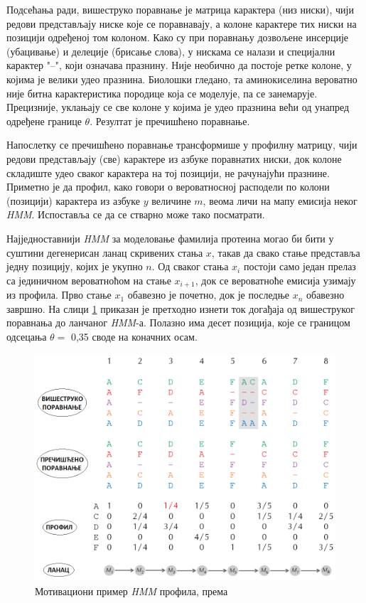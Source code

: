 \documentclass[12pt,oneside]{memoir}
\begin{document}
\begin{CJK}{UTF8}{ipxm}
Подсећања ради, вишеструко поравнање је матрица карактера (низ ниски), чији редови представљају ниске које се поравнавају, а колоне карактере тих ниски на позицији одређеној том колоном. Како су при поравнању дозвољене инсерције (убацивање) и делеције (брисање слова), у нискама се налази и специјални карактер "--", који означава празнину. Није необично да постоје ретке колоне, у којима је велики удео празнина. Биолошки гледано, та аминокиселина вероватно није битна карактеристика породице која се моделује, па се занемарује. Прецизније, уклањају се све колоне у којима је удео празнина већи од унапред одређене границе $\theta$. Резултат је пречишћено поравнање.

Напослетку се пречишћено поравнање трансформише у профилну матрицу, чији редови представљају (све) карактере из азбуке поравнатих ниски, док колоне складиште удео сваког карактера на тој позицији, не рачунајући празнине. Приметно је да профил, како говори о вероватносној расподели по колони (позицији) карактера из азбуке $y$ величине $m$, веома личи на мапу емисија неког \textit{HMM}. Испоставља се да се стварно може тако посматрати.

Најједноставнији \textit{HMM} за моделовање фамилија протеина могао би бити у суштини дегенерисан ланац скривених стања $x$, такав да свако стање представља једну позицију, којих је укупно $n$. Од сваког стања $x_i$ постоји само један прелаз са јединичном вероватноћом на стање $x_{i+1}$, док се вероватноће емисија узимају из профила. Прво стање $x_1$ обавезно је почетно, док је последње $x_n$ обавезно завршно. На слици \ref{fig:profil} приказан је претходно изнети ток догађаја од вишеструког поравнања до ланчаног \textit{HMM}-а. Полазно има десет позиција, које се границом одсецања $\theta =$ 0,35 своде на коначних осам.

\begin{figure}[!ht]
  \centering
  \includegraphics[width=\textwidth]{profil.png}
  \caption{Мотивациони пример \textit{HMM} профила, према \cite{compeau2015}}
  \label{fig:profil}
\end{figure}


\end{CJK}
\end{document}
